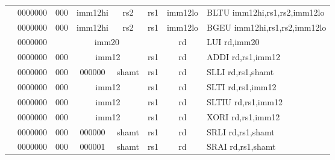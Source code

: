 \begin{table}[p]
\begin{small}
\begin{center}
\begin{tabular}{rcccccccccl}
&
\multicolumn{1}{|c|}{0000000} &
\multicolumn{2}{c|}{000} &
\multicolumn{3}{c|}{imm12hi} &
\multicolumn{1}{c|}{rs2} &
\multicolumn{1}{c|}{rs1} &
\multicolumn{1}{c|}{imm12lo} & BLTU imm12hi,rs1,rs2,imm12lo \\
\cline{2-10}
  

&
\multicolumn{1}{|c|}{0000000} &
\multicolumn{2}{c|}{000} &
\multicolumn{3}{c|}{imm12hi} &
\multicolumn{1}{c|}{rs2} &
\multicolumn{1}{c|}{rs1} &
\multicolumn{1}{c|}{imm12lo} & BGEU imm12hi,rs1,rs2,imm12lo \\
\cline{2-10}
  

&
\multicolumn{1}{|c|}{0000000} &
\multicolumn{7}{c|}{imm20} &
\multicolumn{1}{c|}{rd} & LUI rd,imm20 \\
\cline{2-10}
  

&
\multicolumn{1}{|c|}{0000000} &
\multicolumn{2}{c|}{000} &
\multicolumn{4}{c|}{imm12} &
\multicolumn{1}{c|}{rs1} &
\multicolumn{1}{c|}{rd} & ADDI rd,rs1,imm12 \\
\cline{2-10}
  

&
\multicolumn{1}{|c|}{0000000} &
\multicolumn{2}{c|}{000} &
\multicolumn{2}{c|}{000000} &
\multicolumn{2}{c|}{shamt} &
\multicolumn{1}{c|}{rs1} &
\multicolumn{1}{c|}{rd} & SLLI rd,rs1,shamt \\
\cline{2-10}
  

&
\multicolumn{1}{|c|}{0000000} &
\multicolumn{2}{c|}{000} &
\multicolumn{4}{c|}{imm12} &
\multicolumn{1}{c|}{rs1} &
\multicolumn{1}{c|}{rd} & SLTI rd,rs1,imm12 \\
\cline{2-10}
  

&
\multicolumn{1}{|c|}{0000000} &
\multicolumn{2}{c|}{000} &
\multicolumn{4}{c|}{imm12} &
\multicolumn{1}{c|}{rs1} &
\multicolumn{1}{c|}{rd} & SLTIU rd,rs1,imm12 \\
\cline{2-10}
  

&
\multicolumn{1}{|c|}{0000000} &
\multicolumn{2}{c|}{000} &
\multicolumn{4}{c|}{imm12} &
\multicolumn{1}{c|}{rs1} &
\multicolumn{1}{c|}{rd} & XORI rd,rs1,imm12 \\
\cline{2-10}
  

&
\multicolumn{1}{|c|}{0000000} &
\multicolumn{2}{c|}{000} &
\multicolumn{2}{c|}{000000} &
\multicolumn{2}{c|}{shamt} &
\multicolumn{1}{c|}{rs1} &
\multicolumn{1}{c|}{rd} & SRLI rd,rs1,shamt \\
\cline{2-10}
  

&
\multicolumn{1}{|c|}{0000000} &
\multicolumn{2}{c|}{000} &
\multicolumn{2}{c|}{000001} &
\multicolumn{2}{c|}{shamt} &
\multicolumn{1}{c|}{rs1} &
\multicolumn{1}{c|}{rd} & SRAI rd,rs1,shamt \\
\cline{2-10}
  


\end{tabular}
\end{center}
\end{small}
\end{table}
